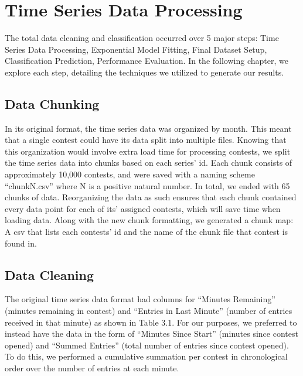 




\section{Time Series Data Processing}

The total data cleaning and classification occurred over 5 major steps: Time Series Data Processing, Exponential Model Fitting, Final Dataset Setup, Classification Prediction, Performance Evaluation. In the following chapter, we explore each step, detailing the techniques we utilized to generate our results.

\subsection{Data Chunking}

In its original format, the time series data was organized by month. This meant that a single contest could have its data split into multiple files. Knowing that this organization would involve extra load time for processing contests, we split the time series data into chunks based on each series' id. Each chunk consists of approximately 10,000 contests, and were saved with a naming scheme ``chunkN.csv'' where N is a positive natural number. In total, we ended with 65 chunks of data. Reorganizing the data as such ensures that each chunk contained every data point for each of its' assigned contests, which will save time when loading data. Along with the new chunk formatting, we generated a chunk map: A csv that lists each contests' id and the name of the chunk file that contest is found in. 

\subsection{Data Cleaning}

The original time series data format had columns for ``Minutes Remaining'' (minutes remaining in contest) and ``Entries in Last Minute'' (number of entries received in that minute) as shown in Table 3.1. For our purposes, we preferred to instead have the data in the form of ``Minutes Since Start'' (minutes since contest opened) and ``Summed Entries'' (total number of entries since contest opened). To do this, we performed a cumulative summation per contest in chronological order over the number of entries at each minute. 

